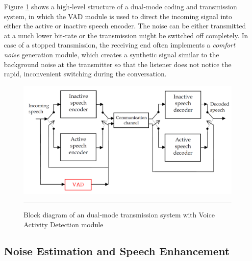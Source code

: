 Figure \ref{fig:DTXVAD} shows a high-level structure of a dual-mode coding and transmission system, in which the VAD module is used to direct the incoming signal into either the active or inactive speech encoder. The noise can be either transmitted at a much lower bit-rate or the transmission might be switched off completely. In case of a stopped transmission, the receiving end often implements a \emph{comfort noise} \citep{GSMControl, G729, RamirezGorriz} generation module, which creates a synthetic signal similar to the background noise at the transmitter so that the listener does not notice the rapid, inconvenient switching during the conversation.

\begin{figure}[htbp]
	\centering
		\includegraphics[width=1\columnwidth]{Figures/Chapter1/DTXVAD.png}
		\rule{37em}{0.5pt}
	\caption[Dual-mode transmission system with Voice Activity Detection module]{Block diagram of an dual-mode transmission system with Voice Activity Detection module \cite{G729}}
	\label{fig:DTXVAD}
\end{figure}

\subsection{Noise Estimation and Speech Enhancement}

